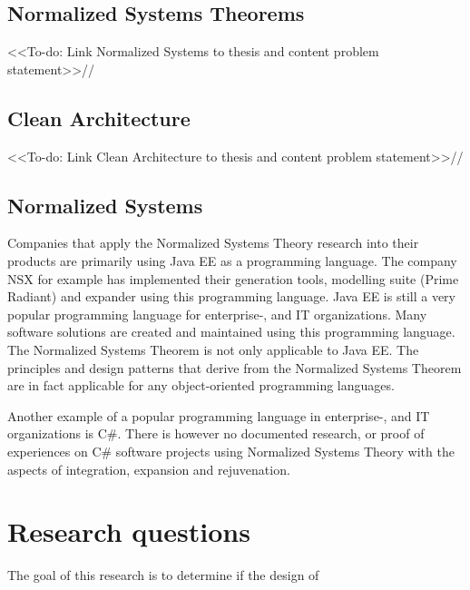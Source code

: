 \subsection{Normalized Systems Theorems}
<<To-do: Link Normalized Systems to thesis and content problem statement>>//

\lipsum[1-1]

\subsection{Clean Architecture}
<<To-do: Link Clean Architecture to thesis and content problem statement>>//
\lipsum[1-1]

\subsection{Normalized Systems}
Companies that apply the Normalized Systems Theory research into their products are
primarily using Java EE as a programming language. The company NSX for example has
implemented their generation tools, modelling suite (Prime Radiant) and expander using
this programming language. Java EE is still a very popular programming language for
enterprise-, and IT organizations. Many software solutions are created and maintained
using this programming language. The Normalized Systems Theorem is not only applicable to
Java EE. The principles and design patterns that derive from the Normalized Systems
Theorem are in fact applicable for any object-oriented programming languages. 

Another example of a popular programming language in enterprise-, and IT organizations is
C\#. There is however no documented research, or proof of experiences on C\# software
projects using Normalized Systems Theory with the aspects of integration, expansion and
rejuvenation.

\section{Research questions} \label{research_questions}
The goal of this research is to determine if the design of 